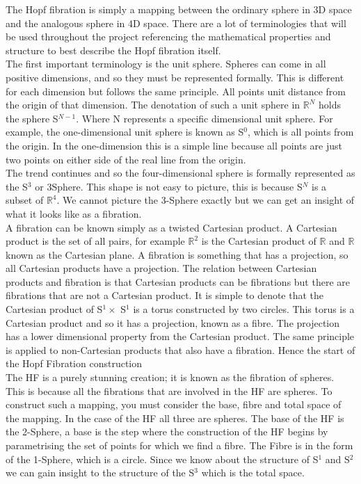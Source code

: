 \documentclass[12pt]{article} %
\begin{document}
\begin{flushleft}
The Hopf fibration is simply a mapping between the ordinary sphere in 3D space and the analogous sphere in 4D space. There are a lot of terminologies that will be used throughout the project referencing the mathematical properties and structure to best describe the Hopf fibration itself.\\
The first important terminology is the unit sphere. Spheres can come in all positive dimensions, and so they must be represented formally. This is different for each dimension but follows the same principle. All points unit distance from the origin of that dimension. The denotation of such a unit sphere in $\mathbb{R}^{N}$ holds the sphere S$^{N-1}$. Where N represents a specific dimensional unit sphere. For example, the one-dimensional unit sphere is known as S$^{0}$, which is all points from the origin. In the one-dimension this is a simple line because all points are just two points on either side of the real line from the origin.\\
The trend continues and so the four-dimensional sphere is formally represented as the S$^{3}$ or 3Sphere. This shape is not easy to picture, this is because S$^{N}$ is a subset of $\mathbb{R}^{4}$. We cannot picture the 3-Sphere exactly but we can get an insight of what it looks like as a fibration.\\
A fibration can be known simply as a twisted Cartesian product. A Cartesian product is the set of all pairs, for example $\mathbb{R}^{2}$ is the Cartesian product of $\mathbb{R}$ and $\mathbb{R}$ known as the Cartesian plane. A fibration is something that has a projection, so all Cartesian products have a projection. The relation between Cartesian products and fibration is that Cartesian products can be fibrations but there are fibrations that are not a Cartesian product. It is simple to denote that the Cartesian product of S$^{1} \times$ S$^{1}$  is a torus constructed by two circles. This torus is a Cartesian product and so it has a projection, known as a fibre. The projection has a lower dimensional property from the Cartesian product. The same principle is applied to non-Cartesian products that also have a fibration. Hence the start of the Hopf Fibration construction\\
The HF is a purely stunning creation; it is known as the fibration of spheres. This is because all the fibrations that are involved in the HF are spheres. To construct such a mapping, you must consider the base, fibre and total space of the mapping. In the case of the HF all three are spheres. The base of the HF is the 2-Sphere, a base is the step where the construction of the HF begins by parametrising the set of points for which we find a fibre. The Fibre is in the form of the 1-Sphere, which is a circle. Since we know about the structure of S$^{1}$ and S$^{2}$ we can gain insight to the structure of the S$^{3}$ which is the total space.\\

\end{flushleft}
\end{document}
